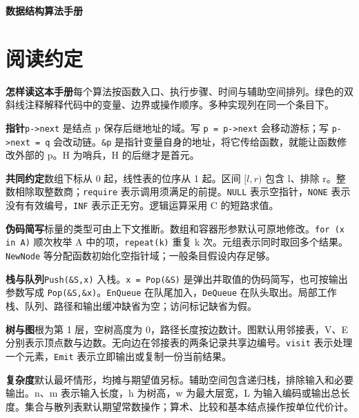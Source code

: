 \documentclass[11pt,a4paper]{article}
\newcommand{\running}{目录}
\begin{document}
\color{ink}
\begin{titlepage}\thispagestyle{empty}
\vspace*{0.27\textheight}
{\sffamily\bfseries\fontsize{30}{43}\selectfont 数据结构算法手册\par}
\vspace{9pt}{\color{accent}\rule{43mm}{1.4pt}}\par
\vspace{9pt}{\large C 风格伪代码与复杂度}\par
\end{titlepage}
\tableofcontents{}
\clearpage{}
\renewcommand{\running}{阅读约定}
\section*{阅读约定}
\textbf{怎样读这本手册}\quad 每个算法按函数入口、执行步骤、时间与辅助空间排列。绿色的双斜线注释解释代码中的变量、边界或操作顺序。多种实现列在同一个条目下。\par\medskip
\textbf{指针}\quad \texttt{p->next} 是结点 p 保存后继地址的域。写 \texttt{p = p->next} 会移动游标；写 \texttt{p->next = q} 会改动链。\texttt{\&p} 是指针变量自身的地址，将它传给函数，就能让函数修改外部的 p。H 为哨兵，H 的后继才是首元。\par\medskip
\textbf{共同约定}\quad 数组下标从 0 起，线性表的位序从 1 起。区间 $[l,r)$ 包含 l、排除 r。整数相除取整数商；\texttt{require} 表示调用须满足的前提。\texttt{NULL} 表示空指针，\texttt{NONE} 表示没有有效编号，\texttt{INF} 表示正无穷。逻辑运算采用 C 的短路求值。\par\medskip
\textbf{伪码简写}\quad 标量的类型可由上下文推断。数组和容器形参默认可原地修改。\texttt{for (x in A)} 顺次枚举 A 中的项，\texttt{repeat(k)} 重复 k 次。元组表示同时取回多个结果。\texttt{NewNode} 等分配函数初始化空指针域；一般条目假设内存足够。\par\medskip
\textbf{栈与队列}\quad \texttt{Push(\&S,x)} 入栈。\texttt{x = Pop(\&S)} 是弹出并取值的伪码简写，也可按输出参数写成 \texttt{Pop(\&S,\&x)}。\texttt{EnQueue} 在队尾加入，\texttt{DeQueue} 在队头取出。局部工作栈、队列、路径和输出缓冲缺省为空；访问标记缺省为假。\par\medskip
\textbf{树与图}\quad 根为第 1 层，空树高度为 0，路径长度按边数计。图默认用邻接表，V、E 分别表示顶点数与边数。无向边在邻接表的两条记录共享边编号。\texttt{visit} 表示处理一个元素，\texttt{Emit} 表示立即输出或复制一份当前结果。\par\medskip
\textbf{复杂度}\quad 默认最坏情形，均摊与期望值另标。辅助空间包含递归栈，排除输入和必要输出。n、m 表示输入长度，h 为树高，w 为最大层宽，L 为输入编码或输出总长度。集合与散列表默认期望常数操作；算术、比较和基本结点操作按单位代价计。
\end{document}
